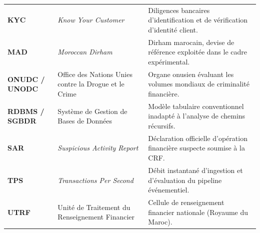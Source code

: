 \begin{table}[htbp]
\begin{tabularx}{\textwidth}{l p{4.8cm} X}
\textbf{KYC} & \textit{Know Your Customer} & Diligences bancaires d'identification et de vérification d'identité client. \\
\textbf{MAD} & \textit{Moroccan Dirham} & Dirham marocain, devise de référence exploitée dans le cadre expérimental. \\
\textbf{ONUDC / UNODC} & Office des Nations Unies contre la Drogue et le Crime & Organe onusien évaluant les volumes mondiaux de criminalité financière. \\
\textbf{RDBMS / SGBDR} & Système de Gestion de Bases de Données & Modèle tabulaire conventionnel inadapté à l'analyse de chemins récursifs. \\
\textbf{SAR} & \textit{Suspicious Activity Report} & Déclaration officielle d'opération financière suspecte soumise à la CRF. \\
\textbf{TPS} & \textit{Transactions Per Second} & Débit instantané d'ingestion et d'évaluation du pipeline événementiel. \\
\textbf{UTRF} & Unité de Traitement du Renseignement Financier & Cellule de renseignement financier nationale (Royaume du Maroc). \\
\bottomrule
\end{tabularx}
\end{table}
